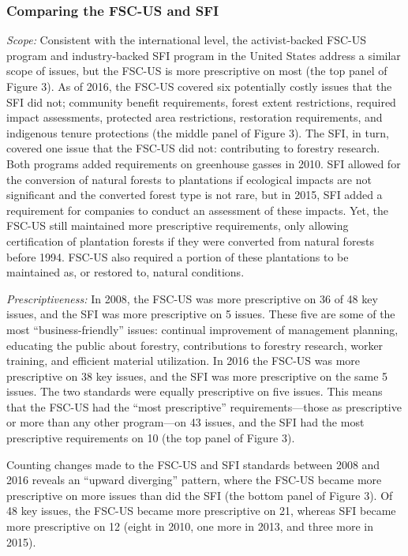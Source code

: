 \documentclass[
      12pt,
            Review ]{article}
\begin{document}
\hypertarget{comparing-the-fsc-us-and-sfi}{%
\subsubsection{Comparing the FSC-US and SFI}\label{comparing-the-fsc-us-and-sfi}}

\emph{Scope:} Consistent with the international level, the activist-backed FSC-US program and industry-backed SFI program in the United States address a similar scope of issues, but the FSC-US is more prescriptive on most (the top panel of Figure 3). As of 2016, the FSC-US covered six potentially costly issues that the SFI did not; community benefit requirements, forest extent restrictions, required impact assessments, protected area restrictions, restoration requirements, and indigenous tenure protections (the middle panel of Figure 3). The SFI, in turn, covered one issue that the FSC-US did not: contributing to forestry research. Both programs added requirements on greenhouse gasses in 2010. SFI allowed for the conversion of natural forests to plantations if ecological impacts are not significant and the converted forest type is not rare, but in 2015, SFI added a requirement for companies to conduct an assessment of these impacts. Yet, the FSC-US still maintained more prescriptive requirements, only allowing certification of plantation forests if they were converted from natural forests before 1994. FSC-US also required a portion of these plantations to be maintained as, or restored to, natural conditions.

\emph{Prescriptiveness:} In 2008, the FSC-US was more prescriptive on 36 of 48 key issues, and the SFI was more prescriptive on 5 issues. These five are some of the most ``business-friendly'' issues: continual improvement of management planning, educating the public about forestry, contributions to forestry research, worker training, and efficient material utilization. In 2016 the FSC-US was more prescriptive on 38 key issues, and the SFI was more prescriptive on the same 5 issues. The two standards were equally prescriptive on five issues. This means that the FSC-US had the ``most prescriptive'' requirements---those as prescriptive or more than any other program---on 43 issues, and the SFI had the most prescriptive requirements on 10 (the top panel of Figure 3).

Counting changes made to the FSC-US and SFI standards between 2008 and 2016 reveals an ``upward diverging'' pattern, where the FSC-US became more prescriptive on more issues than did the SFI (the bottom panel of Figure 3). Of 48 key issues, the FSC-US became more prescriptive on 21, whereas SFI became more prescriptive on 12 (eight in 2010, one more in 2013, and three more in 2015).
\end{document}
